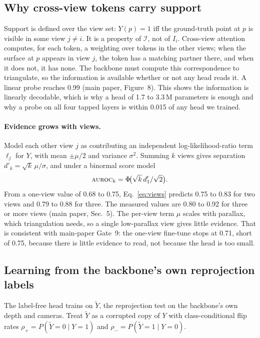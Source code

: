 \subsection{Why cross-view tokens carry support}

Support is defined over the view set: $Y(p)=1$ iff the ground-truth point at
$p$ is visible in some view $j\neq i$. It is a property of $\mathcal{I}$, not
of $I_i$. Cross-view attention computes, for each token, a weighting over
tokens in the other views; when the surface at $p$ appears in view $j$, the
token has a matching partner there, and when it does not, it has none. The
backbone must compute this correspondence to triangulate, so the information
is available whether or not any head reads it. A linear probe reaches
\auroc{} 0.99 (main paper, Figure~8). This shows the information is linearly
decodable, which is why a head of 1.7 to 3.3\,M parameters is enough and why a
probe on all four tapped layers is within 0.015 of any head we trained.

\paragraph{Evidence grows with views.}
Model each other view $j$ as contributing an independent log-likelihood-ratio
term $\ell_j$ for $Y$, with mean $\pm\mu/2$ and variance $\sigma^2$. Summing
$k$ views gives separation $d'_k=\sqrt{k}\,\mu/\sigma$, and under a binormal
score model
\begin{equation}
  \textsc{auroc}_k=\Phi\!\big(\sqrt{k}\,d'_1/\sqrt2\big).
  \label{eq:views}
\end{equation}
From a one-view value of 0.68 to 0.75, Eq.~\eqref{eq:views} predicts 0.75 to 0.83
for two views and 0.79 to 0.88 for three. The measured values are 0.80 to 0.92
for three or more views (main paper, Sec.~5). The per-view term $\mu$ scales with
parallax, which triangulation needs, so a single low-parallax view gives
little evidence. That is consistent with main-paper Gate~9: the one-view fine-tune
stops at 0.71, short of 0.75, because there is little evidence to read, not
because the head is too small.

\subsection{Learning from the backbone's own reprojection labels}

The label-free head trains on $\tilde Y$, the reprojection test on the
backbone's own depth and cameras. Treat $\tilde Y$ as a corrupted copy of $Y$
with class-conditional flip rates $\rho_{+}=P(\tilde Y\!=\!0\mid Y\!=\!1)$ and
$\rho_{-}=P(\tilde Y\!=\!1\mid Y\!=\!0)$.

